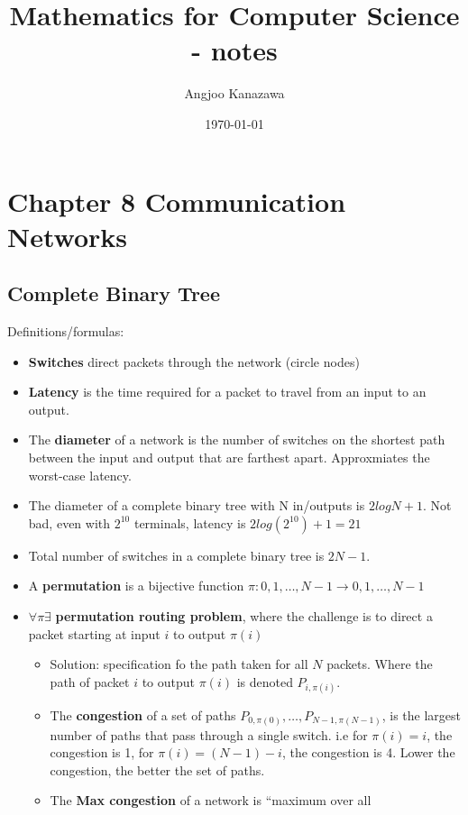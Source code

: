 \documentclass[10pt]{article}
\title{Mathematics for Computer Science - notes}
\author{Angjoo Kanazawa}
\date{\today}
\newcounter{set}
\newcommand{\ra}{\rightarrow}
\begin{document}
\maketitle \thispagestyle{empty}
\setcounter{section}{7}
\section{Chapter 8 Communication Networks}
\label{sec:chapt-8-comm}

\subsection{Complete Binary Tree}
\label{sec:complete-binary-tree}

Definitions/formulas:
\begin{itemize}
\item \textbf{Switches} direct packets through the network (circle nodes)
\item \textbf{Latency} is the time required for a packet to travel from an input to an output.
\item The \textbf{diameter} of a network is the number of switches on the shortest path between
the input and output that are farthest apart. Approxmiates the
worst-case latency.
\item The diameter of a complete binary tree with N in/outputs is
  $2logN+1$. Not bad, even with $2^{10}$ terminals, latency is
  $2log(2^{10})+1 = 21$
\item Total number of switches in a complete binary tree is $2N-1$.
\item A \textbf{permutation} is a bijective function $\pi: {0, 1,\dots, N-1} \ra
  {0, 1, \dots, N-1}$
\item $\forall \pi \exists$ \textbf{permutation routing problem},
  where the challenge is to direct a packet starting at input $i$ to
  output $\pi(i)$
  \begin{itemize}
  \item Solution: specification fo the path taken for all $N$
    packets. Where the path of packet $i$ to output $\pi(i)$ is
    denoted $P_{i, \pi(i)}$.
  \item The \textbf{congestion} of a set of paths $P_{0,\pi(0)},
    \dots, P_{N-1, \pi(N-1)} $, is the largest number of paths that pass
    through a single switch. i.e for $\pi(i) = i$, the congestion is 1,
    for $\pi(i) = (N-1)-i$, the congestion is 4. Lower the congestion,
    the better the set of paths.
  \item The \textbf{Max congestion} of a network is ``maximum over all

\end{itemize}
\end{itemize}
\end{document}
